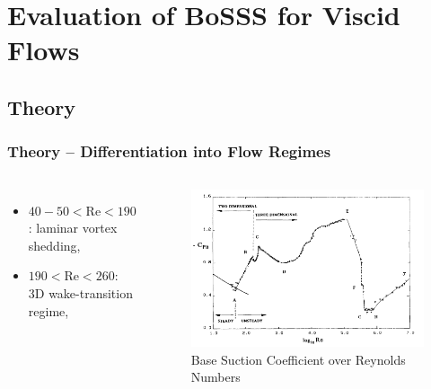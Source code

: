 \section{Evaluation of BoSSS for Viscid Flows}
\frame{\tableofcontents[currentsection]}
	\subsection{Theory}
	\begin{frame}
		\frametitle{Theory -- Differentiation into Flow Regimes}
		\begin{columns}[t]
			\column[]{5cm}
			\begin{itemize}
				\item $40-50 < \text{Re} < 190$: laminar vortex shedding,
				\item $190 < \text{Re} < 260$: 3D wake-transition regime,
			\end{itemize}
			\column[]{7cm}
			\begin{figure}[ht]
				 \vspace{-1cm}
				\includegraphics[width=\textwidth]{img/overviewCylinderReynolds_Williamson.PNG}
				\caption{Base Suction Coefficient over Reynolds Numbers \cite{williamson}}
			\end{figure}
		\end{columns}
	\end{frame}

